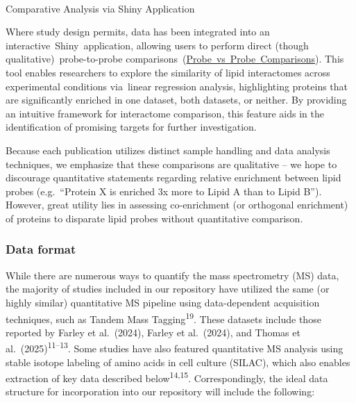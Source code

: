 \documentclass[
  letterpaper,
  DIV=11,
  numbers=noendperiod]{scrartcl}
\makeatletter
\let\oldparagraph\paragraph
\renewcommand{\paragraph}{
    \@ifstar
      \xxxParagraphStar
      \xxxParagraphNoStar
  }
\newcommand{\xxxParagraphStar}[1]{\oldparagraph*{#1}\mbox{}}
\newcommand{\xxxParagraphNoStar}[1]{\oldparagraph{#1}\mbox{}}
\makeatother
\begin{document}
\paragraph{Comparative Analysis via Shiny
Application}\label{comparative-analysis-via-shiny-application}

Where study design permits, data has been integrated into an
interactive~Shiny~application, allowing users to perform direct (though
qualitative)~probe-to-probe
comparisons~(\href{https://www.lipidinteractome.org/lipidprobe/enrichedhitscomparison}{Probe~vs~Probe~Comparisons}).
This tool enables researchers to explore the similarity of lipid
interactomes across experimental conditions via~linear regression
analysis, highlighting proteins that are significantly enriched in one
dataset, both datasets, or neither. By providing an intuitive framework
for interactome comparison, this feature aids in the identification of
promising targets for further investigation.

Because each publication utilizes distinct sample handling and data
analysis techniques, we emphasize that these comparisons are qualitative
-- we hope to discourage quantitative statements regarding relative
enrichment between lipid probes (e.g.~``Protein X is enriched 3x more to
Lipid A than to Lipid B''). However, great utility lies in assessing
co-enrichment (or orthogonal enrichment) of proteins to disparate lipid
probes without quantitative comparison.

\subsubsection{Data format}\label{data-format}

While there are numerous ways to quantify the mass spectrometry (MS)
data, the majority of studies included in our repository have utilized
the same (or highly similar) quantitative MS pipeline using
data-dependent acquisition techniques, such as Tandem Mass
Tagging\textsuperscript{19}. These datasets include those reported by
Farley et al.~(2024), Farley et al.~(2024), and Thomas et
al.~(2025)\textsuperscript{11--13}. Some studies have also featured
quantitative MS analysis using stable isotope labeling of amino acids in
cell culture (SILAC), which also enables extraction of key data
described below\textsuperscript{14,15}. Correspondingly, the ideal data
structure for incorporation into our repository will include the
following:
\end{document}
